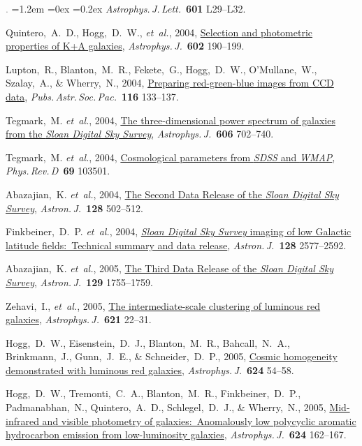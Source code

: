 \documentclass[10pt,letterpaper]{article}
\newcommand{\acronym}[1]{{\small{#1}}}
\newcommand{\foreign}[1]{\textsl{#1}}
\newcommand{\etal}{\foreign{et~al.}}
\newcommand{\project}[1]{\textsl{#1}}
\newcommand{\doi}[2]{\href{http://dx.doi.org/#1}{{#2}}}
\newcommand{\deemph}[1]{\textcolor{grey}{\footnotesize{#1}}}
\newcommand{\pubnumber}[1]{\deemph{{#1}.}}
\newcounter{refpubnum}
\newcommand{\hogglist}{%
    \rightmargin=0in
    \leftmargin=1.2em
    \topsep=0ex
    \partopsep=0pt
    \itemsep=0.2ex
    \parsep=0pt
    \itemindent=-1.0\leftmargin
    \listparindent=0.0\leftmargin
    \settowidth{\labelsep}{~}
    \usecounter{refpubnum}
  }
\begin{document}
\begin{list}{\pubnumber{\therefpubnum}}{\hogglist}
\textit{Astrophys.\,J.\,Lett.}\ \textbf{601} L29--L32.
\item\label{pub:Quintero2004}
Quintero,~A.~D., Hogg,~D.~W., \etal, 2004,
\doi{10.1086/380601}{Selection and photometric properties of K+A galaxies},
\textit{Astrophys.\,J.}\ \textbf{602} 190--199.
\item
Lupton,~R., Blanton,~M.~R., Fekete,~G., Hogg,~D.~W., O'Mullane,~W., Szalay,~A., \& Wherry,~N., 2004,
\doi{10.1086/382245}{Preparing red-green-blue images from \acronym{CCD} data},
\textit{Pubs.\,Astr.\,Soc.\,Pac.}\ \textbf{116} 133--137.
\item
Tegmark,~M. \etal, 2004,
\doi{10.1086/382125}{The three-dimensional power spectrum of galaxies from the \project{Sloan Digital Sky Survey}},
\textit{Astrophys.\,J.}\ \textbf{606} 702--740.
\item
Tegmark,~M. \etal, 2004,
\doi{10.1103/PhysRevD.69.103501}{Cosmological parameters from \project{\acronym{SDSS}} and \project{\acronym{WMAP}}},
\textit{Phys.\,Rev.\,D}\ \textbf{69} 103501.
\item
Abazajian,~K. \etal, 2004,
\doi{10.1086/421365}{The Second Data Release of the \project{Sloan Digital Sky Survey}},
\textit{Astron.\,J.}\ \textbf{128} 502--512.
\item
Finkbeiner,~D.~P. \etal, 2004,
\doi{10.1086/425050}{\project{Sloan Digital Sky Survey} imaging of low Galactic latitude fields:\ Technical summary and data release},
\textit{Astron.\,J.}\ \textbf{128} 2577--2592.
\item
Abazajian,~K. \etal, 2005,
\doi{10.1086/427544}{The Third Data Release of the \project{Sloan Digital Sky Survey}},
\textit{Astron.\,J.}\ \textbf{129} 1755--1759.
\item
Zehavi,~I., \etal, 2005,
\doi{10.1086/427495}{The intermediate-scale clustering of luminous red galaxies},
\textit{Astrophys.\,J.}\ \textbf{621} 22--31.
\item
Hogg,~D.~W., Eisenstein,~D.~J., Blanton,~M.~R., Bahcall,~N.~A., Brinkmann,~J., Gunn,~J.~E., \& Schneider,~D.~P., 2005,
\doi{10.1086/429084}{Cosmic homogeneity demonstrated with luminous red galaxies},
\textit{Astrophys.\,J.}\ \textbf{624} 54--58.
\item
Hogg,~D.~W., Tremonti,~C.~A., Blanton,~M.~R., Finkbeiner,~D.~P., Padmanabhan,~N., Quintero,~A.~D., Schlegel,~D.~J., \& Wherry,~N., 2005,
\doi{10.1086/429686}{Mid-infrared and visible photometry of galaxies:\ Anomalously low polycyclic aromatic hydrocarbon emission from low-luminosity galaxies},
\textit{Astrophys.\,J.}\ \textbf{624} 162--167.

\end{list}
\end{document}

